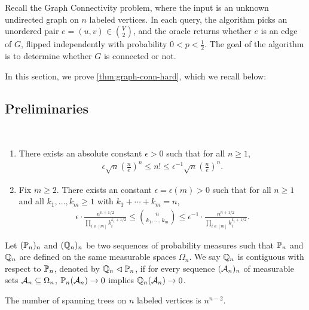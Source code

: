 Recall the Graph Connectivity problem, where the input is an unknown undirected graph on $n$ labeled vertices. In each query, the algorithm picks an unordered pair $e=(u,v)\in \binom V2$, and the oracle returns whether $e$ is an edge of $G$, flipped independently with probability $0<p<\frac 12$. The goal of the algorithm is to determine whether $G$ is connected or not.


In this section, we prove \cref{thm:graph-conn-hard}, which we recall below:
\GraphConnectivity*

\subsection{Preliminaries} \label{sec:conn:prelim}

\begin{lemma} \label{lem:stirling}\
  \begin{enumerate}
    \item There exists an absolute constant $\epsilon>0$ such that for all $n\ge 1$,
    \begin{align*}
      \epsilon \sqrt n\left(\frac ne\right)^n \le n! \le \epsilon^{-1} \sqrt n\left(\frac ne\right)^n.
    \end{align*}
    \item Fix $m\ge 2$. There exists an constant $\epsilon=\epsilon(m)>0$ such that for all $n\ge 1$ and all $k_1,\ldots,k_m\ge 1$ with $k_1+\cdots+k_m=n$,
    \begin{align*}
      \epsilon \cdot \frac{n^{n+1/2}}{\prod_{i\in [m]} k_i^{k_i+1/2}} \le \binom{n}{k_1,\ldots,k_m} \le \epsilon^{-1} \cdot \frac{n^{n+1/2}}{\prod_{i\in [m]} k_i^{k_i+1/2}}.
    \end{align*}
  \end{enumerate}
\end{lemma}

Let $(\mathbb{P}_n)_n$ and $(\mathbb{Q}_n)_n$ be two sequences of probability measures such that $\mathbb{P}_n$ and $\mathbb{Q}_n$ are defined on the same measurable spaces $\Omega_n$.
We say $\mathbb{Q}_n$ is contiguous with respect to $\mathbb{P}_n$, denoted by $\mathbb{Q}_n\vartriangleleft \mathbb{P}_n$, if for every sequence $(\mathcal{A}_n)_n$ of measurable sets $\mathcal{A}_n\subseteq \Omega_n$, $\mathbb{P}_n(\mathcal{A}_n) \to 0$ implies $\mathbb{Q}_n(\mathcal{A}_n)\to 0$.

\begin{lemma} \label{lem:cayley}
The number of spanning trees on $n$ labeled vertices is $n^{n-2}$.
\end{lemma}


